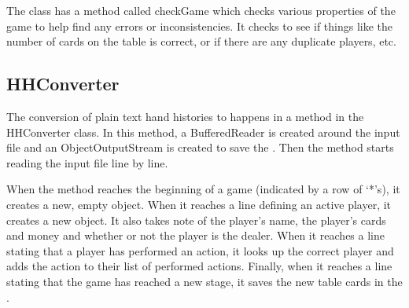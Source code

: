 
The \gr class has a method called checkGame which checks various properties of the game to help find any errors or inconsistencies. It checks to see if things like the number of cards on the table is correct, 
or if there are any duplicate players, etc. 




\subsection{HHConverter}							%

The conversion of plain text hand histories to \grs happens in a method in the HHConverter class. In this method, a BufferedReader is created around the input file and an ObjectOutputStream is created to save the \grs. Then the method starts reading the input file line by line. 

When the method reaches the beginning of a game (indicated by a row of `*'s), it creates a new, empty \gr object. When it reaches a line defining an active player, it creates a new \pr object.
It also takes note of the player's name, the player's cards and money and whether or not the player is the dealer. When it reaches a line stating that a player has performed an action, it looks up the correct player and adds the action to their list of performed actions. Finally, when it reaches a line stating that the game has reached a new stage, it saves the new table cards in the \gr. 

